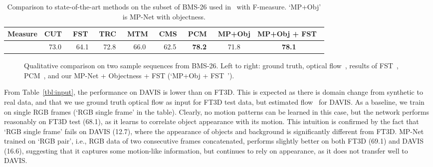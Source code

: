 \documentclass[10pt,twocolumn,letterpaper]{article}
\begin{document}
\begin{table*}
\begin{center}
\begin{tabular}{c|c c c c c c c c}
\hline
Measure & CUT~\cite{keuper2015motion}  & FST~\cite{papazoglou2013fast} & TRC~\cite{fragkiadaki2012video} & MTM~\cite{zamalieva2014multi} & CMS~\cite{Narayana13} & PCM~\cite{Bideau16} & MP+Obj & MP+Obj + FST~\cite{papazoglou2013fast} \\
\hline
 & 73.0 & 64.1 & 72.8 & 66.0 & 62.5 & \textbf{78.2} & 71.8 & \textbf{78.1} \\
\hline
\end{tabular}
\vspace{0.1cm}
\caption{Comparison to state-of-the-art methods on the subset of BMS-26 used
in~\cite{Bideau16} with F-measure. `MP+Obj' is MP-Net with objectness.}
\label{tbl:bms}
\vspace{-0.7cm}
\end{center}
\end{table*}
\begin{figure*}[t]
\begin{center}
\vspace{0.1cm}
\end{center}
\vspace{-0.3cm}\caption{Qualitative comparison on two sample sequences from
BMS-26. Left to right: ground truth, optical flow~\cite{Brox11a}, results of
FST~\cite{papazoglou2013fast}, PCM~\cite{Bideau16}, and our MP-Net + Objectness
+ FST (`MP+Obj + FST~\cite{papazoglou2013fast}').}
\vspace{-0.5cm}
\label{fig:bms}
\end{figure*}

From Table~\ref{tbl:input}, the performance on DAVIS is lower than on FT3D.
This is expected as there is domain change from synthetic to real data, and
that we use ground truth optical flow as input for FT3D test data, but
estimated flow~\cite{Brox11a,sundaram2010dense} for DAVIS. As a baseline, we
train on single RGB frames (`RGB single frame' in the table). Clearly, no
motion patterns can be learned in this case, but the network performs
reasonably on FT3D test (68.1), as it learns to correlate object appearance
with its motion. This intuition is confirmed by the fact that `RGB single
frame' fails on DAVIS (12.7), where the appearance of objects and background is
significantly different from FT3D.  MP-Net trained on `RGB pair', i.e., RGB
data of two consecutive frames concatenated, performs slightly better on both
FT3D (69.1) and DAVIS (16.6), suggesting that it captures some motion-like
information, but continues to rely on appearance, as it does not transfer well
to DAVIS.
\end{document}
